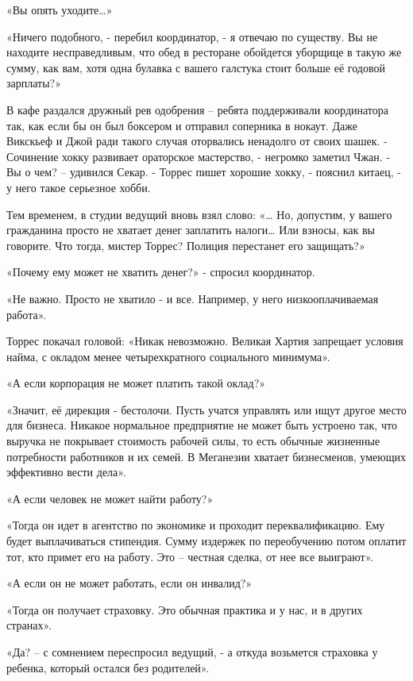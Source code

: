 \documentclass[10pt,final]{book}
\begin{document}
«Вы опять уходите\ldots{}»

«Ничего подобного, - перебил координатор, - я отвечаю по существу. Вы не находите несправедливым, что обед в ресторане обойдется уборщице в такую же сумму, как вам, хотя одна булавка с вашего галстука стоит больше её годовой зарплаты?»

В кафе раздался дружный рев одобрения -- ребята поддерживали координатора так, как если бы он был боксером и отправил соперника в нокаут. Даже Викскьеф и Джой ради такого случая оторвались ненадолго от своих шашек.
- Сочинение хокку развивает ораторское мастерство, - негромко заметил Чжан.
- Вы о чем? -- удивился Секар.
- Торрес пишет хорошие хокку, - пояснил китаец, - у него такое серьезное хобби.

Тем временем, в студии ведущий вновь взял слово:
«\ldots{} Но, допустим, у вашего гражданина просто не хватает денег заплатить налоги\ldots{} Или взносы, как вы говорите. Что тогда, мистер Торрес? Полиция перестанет его защищать?»

«Почему ему может не хватить денег?» - спросил координатор.

«Не важно. Просто не хватило - и все. Например, у него низкооплачиваемая работа».

Торрес покачал головой: «Никак невозможно. Великая Хартия запрещает условия найма, с окладом менее четырехкратного социального минимума».

«А если корпорация не может платить такой оклад?»

«Значит, её дирекция - бестолочи. Пусть учатся управлять или ищут другое место для бизнеса. Никакое нормальное предприятие не может быть устроено так, что выручка не покрывает стоимость рабочей силы, то есть обычные жизненные потребности работников и их семей. В Меганезии хватает бизнесменов, умеющих эффективно вести дела».

«А если человек не может найти работу?»

«Тогда он идет в агентство по экономике и проходит переквалификацию. Ему будет выплачиваться стипендия. Сумму издержек по переобучению потом оплатит тот, кто примет его на работу. Это -- честная сделка, от нее все выиграют».

«А если он не может работать, если он инвалид?»

«Тогда он получает страховку. Это обычная практика и у нас, и в других странах».

«Да? -- с сомнением переспросил ведущий, - а откуда возьмется страховка у ребенка, который остался без родителей».
\end{document}
